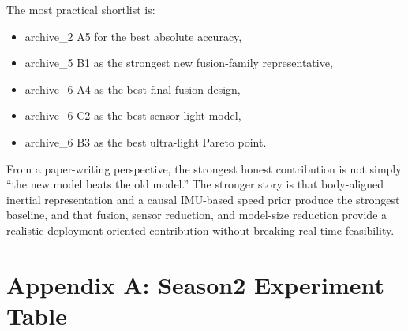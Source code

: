 \documentclass[11pt,a4paper]{article}
\begin{document}
The most practical shortlist is:

\begin{itemize}
\item archive\_2 A5 for the best absolute accuracy,
\item archive\_5 B1 as the strongest new fusion-family representative,
\item archive\_6 A4 as the best final fusion design,
\item archive\_6 C2 as the best sensor-light model,
\item archive\_6 B3 as the best ultra-light Pareto point.
\end{itemize}

From a paper-writing perspective, the strongest honest contribution is not simply ``the new model beats the old model.'' The stronger story is that body-aligned inertial representation and a causal IMU-based speed prior produce the strongest baseline, and that fusion, sensor reduction, and model-size reduction provide a realistic deployment-oriented contribution without breaking real-time feasibility.

\clearpage
\appendix
\section{Appendix A: Season2 Experiment Table}
\small

\end{document}
